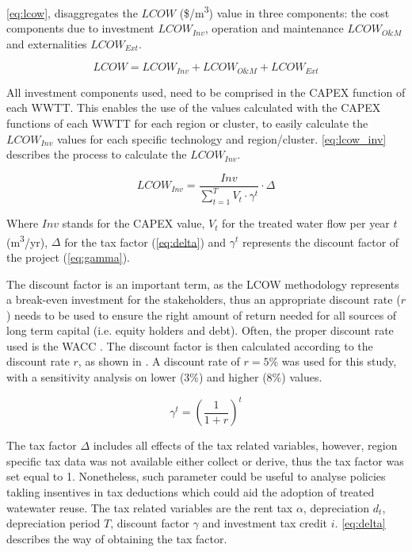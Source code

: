 \documentclass[12pt]{iopart}
\begin{document}
\autoref{eq:lcow}, disaggregates the $LCOW$ (\$/m\textsuperscript{3}) value in three components: the cost components due to investment $LCOW_{Inv}$, operation and maintenance $LCOW_{O\&M}$ and externalities $LCOW_{Ext}$.

\begin{equation}\label{eq:lcow}
LCOW = LCOW_{Inv} + LCOW_{O\&M} + LCOW_{Ext}
\end{equation}

All investment components used, need to be comprised in the CAPEX function of each WWTT. This enables the use of the values calculated with the CAPEX functions of each WWTT for each region or cluster, to easily calculate the $LCOW_{Inv}$ values for each specific technology and region/cluster. \autoref{eq:lcow_inv} describes the process to calculate the $LCOW_{Inv}$.

\begin{equation}\label{eq:lcow_inv}
LCOW_{Inv} = \frac{Inv}{\sum_{t=1}^{T} V_{t}\cdot\gamma^{t}}\cdot\Delta
\end{equation}

Where $Inv$ stands for the CAPEX value, $V_{t}$ for the treated water flow per year $t$ (m\textsuperscript{3}/yr), $\Delta$ for the tax factor (\autoref{eq:delta}) and $\gamma^{t}$ represents the discount factor of the project (\autoref{eq:gamma}).

The discount factor is an important term, as the LCOW methodology represents a break-even investment for the stakeholders, thus an appropriate discount rate ($r$) needs to be used to ensure the right amount of return needed for all sources of long term capital (i.e. equity holders and debt). Often, the proper discount rate used is the WACC \cite{prospectscostcompetitive2013}. The discount factor is then calculated according to the discount rate $r$, as shown in . A discount rate of $r=5\%$ was used for this study, with a sensitivity analysis on lower (3\%) and higher (8\%) values.

\begin{equation}\label{eq:gamma}
\gamma^{t} = \left(\frac{1}{1+r}\right)^{t}
\end{equation}

The tax factor $\Delta$ includes all effects of the tax related variables, however, region specific tax data was not available either collect or derive, thus the tax factor was set equal to 1. Nonetheless, such parameter could be useful to analyse policies takling insentives in tax deductions which could aid the adoption of treated watewater reuse. The tax related variables are the rent tax $\alpha$, depreciation $d_t$, depreciation period $T$, discount factor $\gamma$ and investment tax credit $i$. \autoref{eq:delta} describes the way of obtaining the tax factor.
\end{document}
